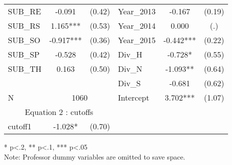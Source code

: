 \begin{table}[htb]
\begin{threeparttable}
\begin{tabular}{l c c|l c c}
    SUB\_RE                                      & -0.091                     & (0.42)               & Year\_2013               & -0.167                 & (0.19)               \\
    SUB\_RS                                      & 1.165***                   & (0.53)               & Year\_2014               & 0.000                  & (.)                  \\
    SUB\_SO                                      & -0.917***                  & (0.36)               & Year\_2015               & -0.442***              & (0.22)               \\
    SUB\_SP                                      & -0.528                     & (0.42)               & Div\_H              & -0.728*                & (0.55)               \\
    SUB\_TH                                      & 0.163                      & (0.50)               & Div\_N              & -1.093**               & (0.64)               \\
                                                 &                            &                      & Div\_S              & -0.681                 & (0.62)               \\
    \cline{1-3}
      N                                          & \multicolumn{2}{|c|}{1060} & Intercept            & 3.702***            & (1.07)                                        \\
    \cline{1-3}
    \multicolumn{3}{c|}{Equation 2 : cutoffs}    &                            &                      &                                                                     \\
    \cline{1-3}
    cutoff1                                      & -1.028*                    & (0.70)               &                     &                        &                      \\
    \hline 
    \hline
  \end{tabular}
  \begin{tablenotes}
  \item{* p<.2, ** p<.1, *** p<.05 \\ Note: Professor dummy variables are omitted to save space.}
  \end{tablenotes}
  \centering\thepage
  \end{threeparttable}
\end{table}

\clearpage{}

\newpage{}

